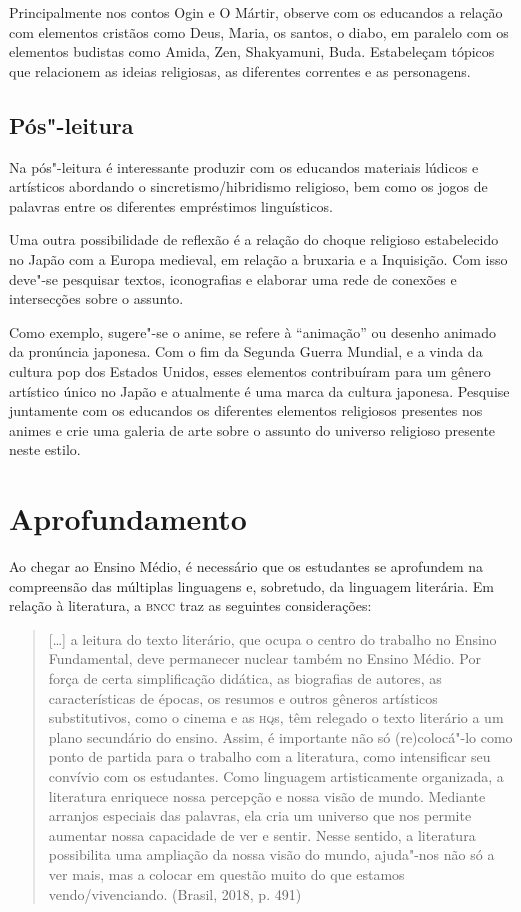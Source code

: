 \documentclass[12pt]{extarticle}
\begin{document}
Principalmente nos contos Ogin e O Mártir, observe com os educandos a
relação com elementos cristãos como Deus, Maria, os santos, o diabo, em
paralelo com os elementos budistas como Amida, Zen, Shakyamuni, Buda.
Estabeleçam tópicos que relacionem as ideias religiosas, as diferentes
correntes e as personagens.


\subsection{Pós"-leitura}

Na pós"-leitura é interessante produzir com os educandos
materiais lúdicos e artísticos abordando o sincretismo/hibridismo
religioso, bem como os jogos de palavras entre os diferentes empréstimos
linguísticos.

Uma outra possibilidade de reflexão é a relação do choque religioso
estabelecido no Japão com a Europa medieval, em relação a bruxaria e a
Inquisição. Com isso deve"-se pesquisar textos, iconografias e elaborar
uma rede de conexões e intersecções sobre o assunto.

Como exemplo, sugere"-se o anime, se refere à ``animação'' ou desenho
animado da pronúncia japonesa. Com o fim da Segunda Guerra Mundial, e a
vinda da cultura pop dos Estados Unidos, esses elementos contribuíram
para um gênero artístico único no Japão e atualmente é uma marca da
cultura japonesa. Pesquise juntamente com os educandos os diferentes
elementos religiosos presentes nos animes e crie uma galeria de arte
sobre o assunto do universo religioso presente neste estilo.

\section{Aprofundamento}

Ao chegar ao Ensino Médio, é necessário que os estudantes se aprofundem
na compreensão das múltiplas linguagens e, sobretudo, da linguagem
literária. Em relação à literatura, a \textsc{bncc} traz as seguintes
considerações:

\begin{quote}
{[}\ldots{}{]} a leitura do texto literário, que ocupa o centro do trabalho
no Ensino Fundamental, deve permanecer nuclear também no Ensino Médio.
Por força de certa simplificação didática, as biografias de autores, as
características de épocas, os resumos e outros gêneros artísticos
substitutivos, como o cinema e as \textsc{hq}s, têm relegado o texto literário a
um plano secundário do ensino. Assim, é importante não só (re)colocá"-lo
como ponto de partida para o trabalho com a literatura, como
intensificar seu convívio com os estudantes. Como linguagem
artisticamente organizada, a literatura enriquece nossa percepção e
nossa visão de mundo. Mediante arranjos especiais das palavras, ela cria
um universo que nos permite aumentar nossa capacidade de ver e sentir.
Nesse sentido, a literatura possibilita uma ampliação da nossa visão do
mundo, ajuda"-nos não só a ver mais, mas a colocar em questão muito do
que estamos vendo/vivenciando. (Brasil, 2018, p. 491)
\end{quote}
\end{document}
